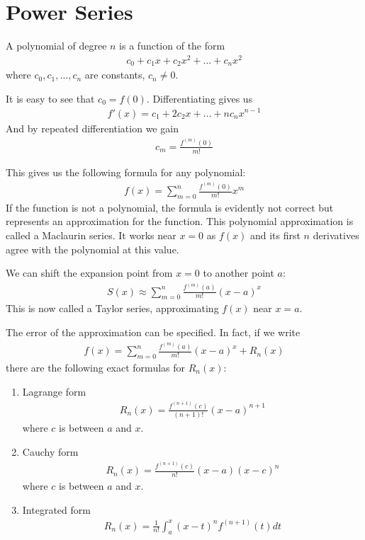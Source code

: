 \section{Power Series}

\begin{df}
	A polynomial of degree $n$ is a function of the form
	\begin{align*}
	c_0+ c_1 x + c_2 x^2 + \dots + c_n x^2
	\end{align*}
	where $c_0, c_1, \dots , c_n$ are constants, $c_n \neq 0$.
\end{df}

\begin{rk}
It is easy to see that $c_0 = f(0)$. Differentiating gives us
\begin{align*}
f'(x) = c_1 + 2c_2 x + \dots + n c_n x^{n-1}
\end{align*}
And by repeated differentiation we gain
\begin{align*}
c_m = \frac{f^{(m)}(0)}{m!}
\end{align*}
\end{rk}
This gives us the following formula for any polynomial:
\begin{align*}
f(x) = \sum_{m=0}^n \frac{f^{(m)} (0)}{m!} x^m
\end{align*}
If the function is not a polynomial, the formula is evidently not correct but represents an approximation for the function.
This polynomial approximation is called a Maclaurin series. It works near $x=0$ as $f(x)$ and its first $n$ derivatives agree with the polynomial at this value. 

We can shift the expansion point from $x=0$ to another point $a$:
\begin{align*}
S(x) \approx \sum_{m=0}^n \frac{f^{(m)}(a)}{m!} (x-a)^x
\end{align*}
This is now called a Taylor series, approximating $f(x)$ near $x=a$.

The error of the approximation can be specified. In fact, if we write
\begin{align*}
f(x) = \sum_{m=0}^n \frac{f^{(m)}(a)}{m!} (x-a)^x + R_n(x)
\end{align*}
there are the following exact formulas for $R_n(x)$:
\begin{enumerate}
	\item
	Lagrange  form
	\begin{align*}
		R_n(x) = \frac{f^{(n+1)}(c)}{(n+1)!} (x-a)^{n+1}
	\end{align*}
	where $c$ is between $a$ and $x$.
	\item
	Cauchy form
	\begin{align*}
	R_n(x) = \frac{f^{(n+1)}(c)}{n!} (x-a)(x-c)^n
	\end{align*}
	where $c$ is between $a$ and $x$.
	\item
	Integrated form
	\begin{align*}
	R_n(x) = \frac{1}{n!} \int_a^x (x-t)^n f^{(n+1)} (t) dt
	\end{align*}
\end{enumerate}

